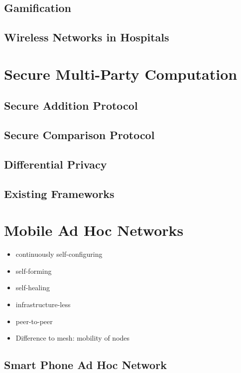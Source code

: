 		\subsection*{Gamification}

		\subsection*{Wireless Networks in Hospitals}
	
	\section{Secure Multi-Party Computation}

		\subsection*{Secure Addition Protocol}

		\subsection*{Secure Comparison Protocol}

		\subsection*{Differential Privacy}

		\subsection*{Existing Frameworks}
	
	\section{Mobile Ad Hoc Networks}
	
	{\color{gray} 
		\begin{itemize}  
			\item continuously self-configuring
			\item self-forming
			\item self-healing
			\item infrastructure-less
			\item peer-to-peer
			\item Difference to mesh: mobility of nodes
		\end{itemize}
	}
	
		\subsection*{Smart Phone Ad Hoc Network}
		
